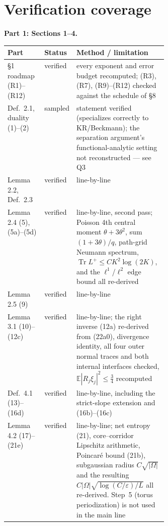 \documentclass[11pt]{article}
\newcommand{\E}{\mathbb{E}}
\begin{document}
\appendix
\section{Verification coverage}
\medskip\noindent\begin{minipage}{\linewidth}\textbf{Part 1: Sections 1--4.}\par\nobreak\smallskip\nobreak
\noindent\begin{tabularx}{\linewidth}{@{}>{\raggedright\arraybackslash}p{0.235\linewidth}>{\raggedright\arraybackslash}p{0.135\linewidth}X@{}}
\toprule
Part & Status & Method / limitation \\
\midrule
\S1 roadmap (R1)--(R12) & verified & every exponent and error budget recomputed; (R3), (R7), (R9)--(R12) checked against the schedule of \S8 \\
Def.\ 2.1, duality (1)--(2) & sampled & statement verified (specializes correctly to KR/Beckmann); the separation argument's functional-analytic setting not reconstructed --- see Q3 \\
Lemma 2.2, Def.\ 2.3 & verified & line-by-line \\
Lemma 2.4 (5), (5a)--(5d) & verified & line-by-line, second pass; Poisson 4th central moment $\theta+3\theta^2$, sum $(1+3\theta)/q$, path-grid Neumann spectrum, $\operatorname{Tr}L^+\le CK^2\log(2K)$, and the $\ell^1$/$\ell^2$ edge bound all re-derived \\
Lemma 2.5 (9) & verified & line-by-line \\
Lemma 3.1 (10)--(12c) & verified & line-by-line; the right inverse (12a) re-derived from (22a0), divergence identity, all four outer normal traces and both internal interfaces checked, $\E|R_j\xi_j|^2\le\frac34$ recomputed \\
Def.\ 4.1 (13)--(16d) & verified & line-by-line, including the strict-slope extension and (16b)--(16c) \\
Lemma 4.2 (17)--(21e) & verified & line-by-line; net entropy (21), core--corridor Lipschitz arithmetic, Poincar\'e bound (21b), subgaussian radius $C\sqrt{|\Omega|}$ and the resulting $C|\Omega|\sqrt{\log(C/\varepsilon)/L}$ all re-derived. Step~5 (torus periodization) is not used in the main line \\
\bottomrule
\end{tabularx}
\end{minipage}
\end{document}
